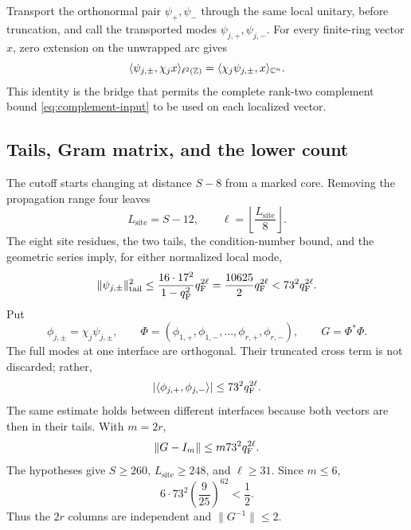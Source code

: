 Transport the orthonormal pair \(\psi_+,\psi_-\) through the same local
unitary, before truncation, and call the transported modes
\(\psi_{j,+},\psi_{j,-}\).  For every finite-ring vector \(x\), zero
extension on the unwrapped arc gives
\begin{equation}
 \langle\psi_{j,\pm},\chi_jx\rangle_{\ell^2(\mathbb Z)}
 =\langle\chi_j\psi_{j,\pm},x\rangle_{\mathbb C^n}.
 \label{eq:complement-identity}
\end{equation}
This identity is the bridge that permits the complete rank-two complement
bound \eqref{eq:complement-input} to be used on each localized vector.

\subsection{Tails, Gram matrix, and the lower count}

The cutoff starts changing at distance \(S-8\) from a marked core.  Removing
the propagation range four leaves
\begin{equation}
 L_{\mathrm{site}}=S-12,\qquad
 \ell=\left\lfloor\frac{L_{\mathrm{site}}}{8}\right\rfloor.
 \label{eq:ell}
\end{equation}
The eight site residues, the two tails, the condition-number bound, and the
geometric series imply, for either normalized local mode,
\begin{equation}
 \|\psi_{j,\pm}\|_{\mathrm{tail}}^2
 \leq\frac{16\cdot17^2}{1-q_{\mathrm F}^2}q_{\mathrm F}^{2\ell}
 =\frac{10625}{2}q_{\mathrm F}^{2\ell}<73^2q_{\mathrm F}^{2\ell}.
 \label{eq:tail}
\end{equation}
Put
\begin{equation}
 \phi_{j,\pm}=\chi_j\psi_{j,\pm},
 \qquad
 \Phi=(\phi_{1,+},\phi_{1,-},\ldots,\phi_{r,+},\phi_{r,-}),
 \qquad G=\Phi^*\Phi.
 \label{eq:phi}
\end{equation}
The full modes at one interface are orthogonal.  Their truncated cross term
is not discarded; rather,
\[
 |\langle\phi_{j,+},\phi_{j,-}\rangle|
 \leq73^2q_{\mathrm F}^{2\ell}.
\]
The same estimate holds between different interfaces because both vectors
are then in their tails.  With \(m=2r\),
\begin{equation}
 \|G-I_m\|\leq m73^2q_{\mathrm F}^{2\ell}.
 \label{eq:gram}
\end{equation}
The hypotheses give \(S\geq260\), \(L_{\mathrm{site}}\geq248\), and
\(\ell\geq31\).  Since \(m\leq6\),
\begin{equation}
 6\cdot73^2\left(\frac9{25}\right)^{62}<\frac12.
 \label{eq:gram-numeric}
\end{equation}
Thus the \(2r\) columns are independent and \(\|G^{-1}\|\leq2\).

